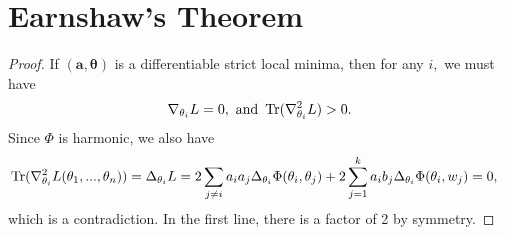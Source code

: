 \section{Earnshaw's Theorem}

\earnshaw*
\begin{proof}
  If $(\boldsymbol{a,\theta})$ is a differentiable strict local
  minima, then for any $i,$ we must have
\[\nabla_{\theta_{i}} L = 0, \text{ and }  \operatorname{Tr}(\nabla^2_{\theta_i}L) > 0.\]
Since $\Phi$ is harmonic, we also have
\begin{align*}
&  \operatorname{Tr}(\nabla^2_{\theta_i}L(\theta_1,...,\theta_n)) = \Delta_{\theta_i} L 
  =  2\sum_{ j\neq i} a_ia_j \Delta_{\theta_i}\Phi(\theta_i,\theta_j)
  + 2\sum_{j=1}^ka_ib_j  \Delta_{\theta_i}\Phi(\theta_i,w_j) = 0,
\end{align*}
which is a contradiction. In the first line, there is a factor of 2 by symmetry.
\end{proof}
